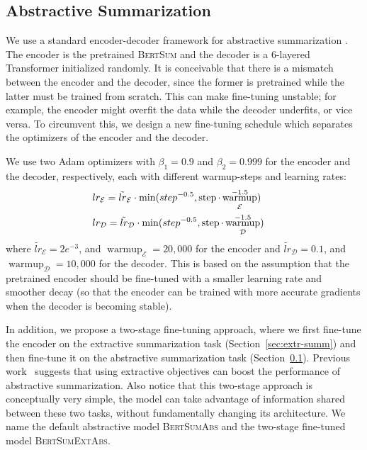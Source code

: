 \documentclass[11pt,a4paper]{article}
\DeclareMathOperator\step{\operatorname{step}}
\DeclareMathOperator\warmup{\operatorname{warmup}}
\begin{document}
    
    
    \subsection{Abstractive Summarization}
    \label{sec:abstr-summ}
    
    We use a standard encoder-decoder framework for abstractive
    summarization \cite{see-acl17}. The encoder is the pretrained
    \textsc{BertSum} and the decoder is a 6-layered Transformer
    initialized randomly.  It is conceivable that there is a mismatch
    between the encoder and the decoder, since the former is pretrained
    while the latter must be trained from scratch. This can make
    fine-tuning unstable; for example, the encoder might overfit the data
    while the decoder underfits, or vice versa.  To circumvent this, we
    design a new fine-tuning schedule which separates the optimizers of
    the encoder and the decoder.
    


    We use two Adam optimizers with $\beta_1=0.9$ and
    $\beta_2=0.999$ for the encoder and the decoder, respectively, each
    with different warmup-steps and learning rates:
    \begin{align}
    &\hspace*{-.4cm}lr_{\mathcal{E}} = \tilde{lr}_{\mathcal{E}}\cdot \min(step^{-0.5}, \step \cdot \warmup_{\mathcal{E}}^{-1.5})\\
    &\hspace*{-.4cm}lr_{\mathcal{D}} = \tilde{lr}_{\mathcal{D}}\cdot \min(step^{-0.5}, \step \cdot \warmup_{\mathcal{D}}^{-1.5})
    \end{align}
    where $\tilde{lr}_{\mathcal{E}}=2e^{-3}$, and
    $\warmup_{\mathcal{E}}=20,000$ for the encoder and
    $\tilde{lr}_{\mathcal{D}}=0.1$, and $\warmup_{\mathcal{D}}=10,000$ for
    the decoder. This is based on the assumption that the pretrained
    encoder should be fine-tuned with a smaller learning rate and smoother
    decay (so that  the encoder can be trained with more accurate gradients when the decoder is becoming stable).
    
    In addition, we propose a two-stage fine-tuning approach, where we
    first fine-tune the encoder on the extractive summarization task
    (Section~\ref{sec:extr-summ}) and then fine-tune it on the abstractive
    summarization task (Section~\ref{sec:abstr-summ}). Previous
    work~\cite{gehrmann2018bottom,li2018improving} suggests that using
    extractive objectives can boost the performance of abstractive
    summarization. Also notice that this two-stage approach is
    conceptually very simple, the model can take advantage of information
    shared between these two tasks, without fundamentally changing its
    architecture.  We name the default abstractive model
    \textsc{BertSumAbs} and the two-stage fine-tuned model
    \textsc{BertSumExtAbs}.
    
\end{document}
